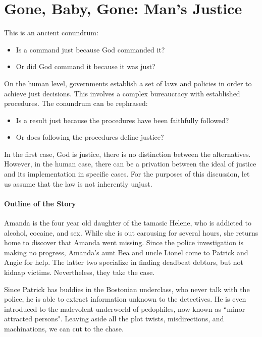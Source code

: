 \section{Gone, Baby, Gone: Man's Justice}

\label{sec:GoneBabyGone}

This is an ancient conundrum:

\begin{itemize}
\item Is a command just because God commanded it? 
\item Or did God command it because it was just? 
\end{itemize}
On the human level, governments establish a set of laws and policies in order to achieve just decisions. This involves a complex bureaucracy with established procedures. The conundrum can be rephrased:

\begin{itemize}
\item Is a result just because the procedures have been faithfully followed? 
\item Or does following the procedures define justice? 
\end{itemize}
In the first case, God is justice, there is no distinction between the alternatives. However, in the human case, there can be a privation between the ideal of justice and its implementation in specific cases. For the purposes of this discussion, let us assume that the law is not inherently unjust.

\paragraph{Outline of the Story}
Amanda is the four year old daughter of the tamasic Helene, who is addicted to alcohol, cocaine, and sex. While she is out carousing for several hours, she returns home to discover that Amanda went missing. Since the police investigation is making no progress, Amanda's aunt Bea and uncle Lionel come to Patrick and Angie for help. The latter two specialize in finding deadbeat debtors, but not kidnap victims. Nevertheless, they take the case.

Since Patrick has buddies in the Bostonian underclass, who never talk with the police, he is able to extract information unknown to the detectives. He is even introduced to the malevolent underworld of pedophiles, now known as ``minor attracted persons". Leaving aside all the plot twists, misdirections, and machinations, we can cut to the chase.

